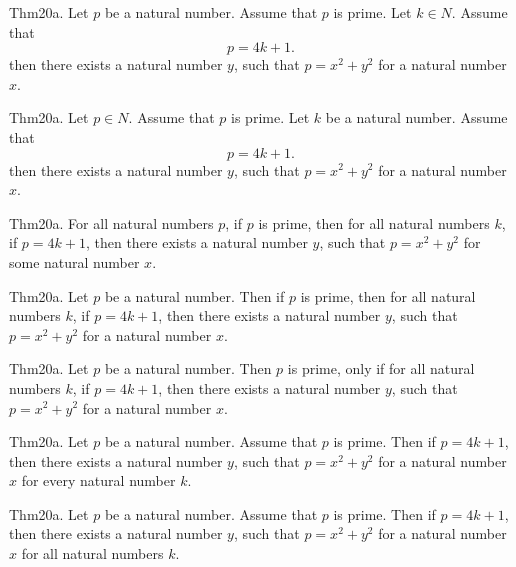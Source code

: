 \documentclass{article}
\begin{document}
Thm20a. Let $p$ be a natural number. Assume that $p$ is prime. Let $k \in N$. Assume that $$p = 4 k + 1.$$ then there exists a natural number $y$, such that $p = x ^{ 2}+ y ^{ 2}$ for a natural number $x$.

Thm20a. Let $p \in N$. Assume that $p$ is prime. Let $k$ be a natural number. Assume that $$p = 4 k + 1.$$ then there exists a natural number $y$, such that $p = x ^{ 2}+ y ^{ 2}$ for a natural number $x$.

Thm20a. For all natural numbers $p$, if $p$ is prime, then for all natural numbers $k$, if $p = 4 k + 1$, then there exists a natural number $y$, such that $p = x ^{ 2}+ y ^{ 2}$ for some natural number $x$.

Thm20a. Let $p$ be a natural number. Then if $p$ is prime, then for all natural numbers $k$, if $p = 4 k + 1$, then there exists a natural number $y$, such that $p = x ^{ 2}+ y ^{ 2}$ for a natural number $x$.

Thm20a. Let $p$ be a natural number. Then $p$ is prime, only if for all natural numbers $k$, if $p = 4 k + 1$, then there exists a natural number $y$, such that $p = x ^{ 2}+ y ^{ 2}$ for a natural number $x$.

Thm20a. Let $p$ be a natural number. Assume that $p$ is prime. Then if $p = 4 k + 1$, then there exists a natural number $y$, such that $p = x ^{ 2}+ y ^{ 2}$ for a natural number $x$ for every natural number $k$.

Thm20a. Let $p$ be a natural number. Assume that $p$ is prime. Then if $p = 4 k + 1$, then there exists a natural number $y$, such that $p = x ^{ 2}+ y ^{ 2}$ for a natural number $x$ for all natural numbers $k$.
\end{document}
